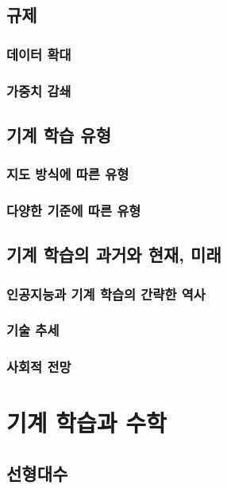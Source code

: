 \documentclass [12pt] {oblivoir}
\let\oldsubsubsection=\subsubsection
\renewcommand{\subsubsection}
{
  \filbreak
  \oldsubsubsection
}
\begin{document}
\subsection{규제}

\subsubsection{데이터 확대}

\subsubsection{가중치 감쇄}

\subsection{기계 학습 유형}

\subsubsection{지도 방식에 따른 유형}

\subsubsection{다양한 기준에 따른 유형}

\subsection{기계 학습의 과거와 현재, 미래}

\subsubsection{인공지능과 기계 학습의 간략한 역사}

\subsubsection{기술 추세}

\subsubsection{사회적 전망}

\newpage
\section{기계 학습과 수학}

\subsection{선형대수}
\end{document}
